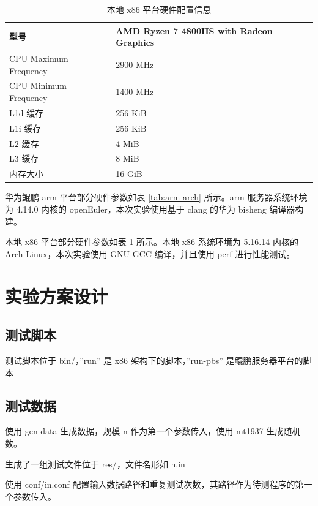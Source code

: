 \documentclass[a4paper]{article}
\begin{document}
\begin{table}[]
  \centering
  \begin{tabular}{ll}
    \hline
    型号                  & AMD Ryzen 7 4800HS with Radeon Graphics \\   \hline
    CPU Maximum Frequency & 2900 MHz                                \\   \hline
    CPU Minimum Frequency & 1400 MHz                                \\   \hline
    L1d 缓存              & 256 KiB                                 \\   \hline
    L1i 缓存              & 256 KiB                                 \\   \hline
    L2 缓存               & 4 MiB                                   \\   \hline
    L3 缓存               & 8 MiB                                   \\   \hline
    内存大小              & 16 GiB                                  \\   \hline
  \end{tabular}
  \caption{本地 x86 平台硬件配置信息}
  \label{tab:x86-arch}
\end{table}

华为鲲鹏 arm 平台部分硬件参数如表 \ref{tab:arm-arch} 所示。arm 服务器系统环境为 4.14.0 内核的 openEuler，本次实验使用基于 clang 的华为 bisheng 编译器构建。

本地 x86 平台部分硬件参数如表 \ref{tab:x86-arch} 所示。本地 x86 系统环境为 5.16.14 内核的 Arch Linux，本次实验使用 GNU GCC 编译，并且使用 perf 进行性能测试。

\section{实验方案设计}
\subsection{测试脚本}
测试脚本位于 bin/，''run'' 是 x86 架构下的脚本，''run-pbs'' 是鲲鹏服务器平台的脚本

\subsection{测试数据}
使用 gen-data 生成数据，规模 n 作为第一个参数传入，使用 mt1937 生成随机数。

生成了一组测试文件位于 res/，文件名形如 n.in

使用 conf/in.conf 配置输入数据路径和重复测试次数，其路径作为待测程序的第一个参数传入。
\end{document}

